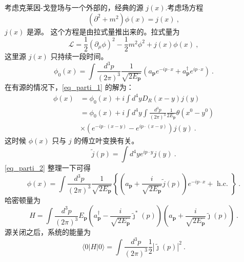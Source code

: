 
考虑克莱因-戈登场与一个外部的，经典的源 $j(x)$.考虑场方程
\begin{equation}\label{eq_parti_1}
(\partial^2+m^2)\phi(x) = j(x)~,
\end{equation}
$j(x)$ 是源。 这个方程是由拉式量推出来的。拉式量为
\begin{equation}
\mathcal L = \frac{1}{2} (\partial_\mu\phi)^2 - \frac{1}{2} m^2 \phi^2 + j(x) \phi(x)~,
\end{equation}
这里源 $j(x)$ 只持续一段时间。
\begin{equation}
\phi_{0}(x)=\int \frac{d^{3} p}{(2 \pi)^{3}} \frac{1}{\sqrt{2 E_{\mathbf{p}}}}\left(a_{\mathbf{p}} e^{-i p \cdot x}+a_{\mathbf{p}}^{\dagger} e^{i p \cdot x}\right)~.
\end{equation}
在有源的情况下，\autoref{eq_parti_1} 的解为：
\begin{equation}\label{eq_parti_2}
\begin{aligned}
\phi(x) & =\phi_{0}(x)+i \int d^{4} y D_{R}(x-y) j(y) \\
& =\phi_{0}(x)+i \int d^{4} y \int \frac{d^{3} p}{(2 \pi)^{3}} \frac{1}{2 E_{\mathbf{p}}} \theta\left(x^{0}-y^{0}\right) \\
& \times\left(e^{-i p \cdot(x-y)}-e^{i p \cdot(x-y)}\right) j(y)~.
\end{aligned}
\end{equation}
这时候 $\phi(x)$ 只与 $j$ 的傅立叶变换有关。
\begin{equation}
\tilde j (p) = \int d^4 y e^{ip \cdot y} j(y)~.
\end{equation}
\autoref{eq_parti_2} 整理一下可得
\begin{equation}
\phi(x)=\int \frac{d^{3} p}{(2 \pi)^{3}} \frac{1}{\sqrt{2 E_{\mathbf{p}}}}\left\{\left(a_{\mathbf{p}}+\frac{i}{\sqrt{2 E_{\mathbf{p}}}} \tilde{j}(p)\right) e^{-i p \cdot x}+\text { h.c. }\right\}~.
\end{equation}
哈密顿量为
\begin{equation}
H=\int \frac{d^{3} p}{(2 \pi)^{3}} E_{\mathbf{p}}\left(a_{\mathbf{p}}^{\dagger}-\frac{i}{\sqrt{2 E_{\mathbf{p}}}} \tilde{\jmath}^{*}(p)\right)\left(a_{\mathbf{p}}+\frac{i}{\sqrt{2 E_{\mathbf{p}}}} \tilde{\jmath}(p)\right)~.
\end{equation}
源关闭之后，系统的能量为
\begin{equation}
\langle 0|H| 0\rangle=\int \frac{d^{3} p}{(2 \pi)^{3}} \frac{1}{2}|\tilde{\jmath}(p)|^{2}~.
\end{equation}


